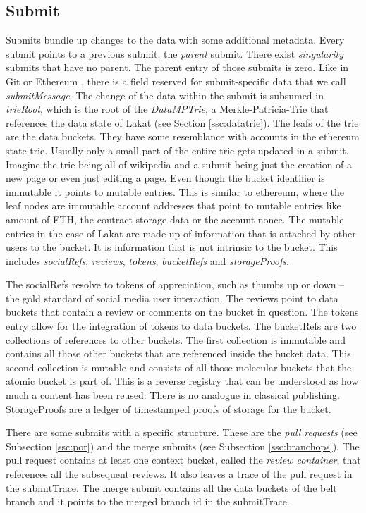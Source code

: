 \documentclass[14pt]{article}
\begin{document}
\subsection{Submit}
\label{ssc:submit}
Submits bundle up changes to the data with some additional metadata. Every submit points to a previous submit, the \textit{parent} submit. There exist \textit{singularity} submits that have no parent. The parent entry of those submits is zero. Like in Git \cite{chacon2014pro} or Ethereum \cite{buterin2013ethereum}, there is a field reserved for submit-specific data that we call \textit{submitMessage}. The change of the data within the submit is subsumed in \textit{trieRoot}, which is the root of the \textit{DataMPTrie}, a Merkle-Patricia-Trie that references the data state of Lakat (see Section \ref{ssc:datatrie}). The leafs of the trie are the data buckets. They have some resemblance with accounts in the ethereum state trie. Usually only a small part of the entire trie gets updated in a submit. Imagine the trie being all of wikipedia and a submit being just the creation of a new page or even just editing a page. Even though the bucket identifier is immutable it points to mutable entries. This is similar to ethereum, where the leaf nodes are immutable account addresses that point to mutable entries like amount of ETH, the contract storage data or the account nonce. The mutable entries in the case of Lakat are made up of information that is attached by other users to the bucket. It is information that is not intrinsic to the bucket. This includes \textit{socialRefs}, \textit{reviews}, \textit{tokens}, \textit{bucketRefs} and \textit{storageProofs}. 

The socialRefs resolve to tokens of appreciation, such as thumbs up or down -- the gold standard of social media user interaction. The reviews point to data buckets that contain a review or comments on the bucket in question. The tokens entry allow for the integration of tokens to data buckets. The bucketRefs are two collections of references to other buckets. The first collection is immutable and contains all those other buckets that are referenced inside the bucket data. This second collection is mutable and consists of all those molecular buckets that the atomic bucket is part of. This is a reverse registry that can be understood as how much a content has been reused. There is no analogue in classical publishing. StorageProofs are a ledger of timestamped proofs of storage for the bucket.  

There are some submits with a specific structure. These are the \textit{pull requests} (see Subsection \ref{ssc:por}) and the merge submits (see Subsection \ref{ssc:branchops}). The pull request  contains at least one context bucket, called the \textit{review container}, that references all the subsequent reviews. It also leaves a trace of the pull request in the submitTrace. The merge submit contains 
all the data buckets of the belt branch and it points to the merged branch id in the submitTrace. 
\end{document}
